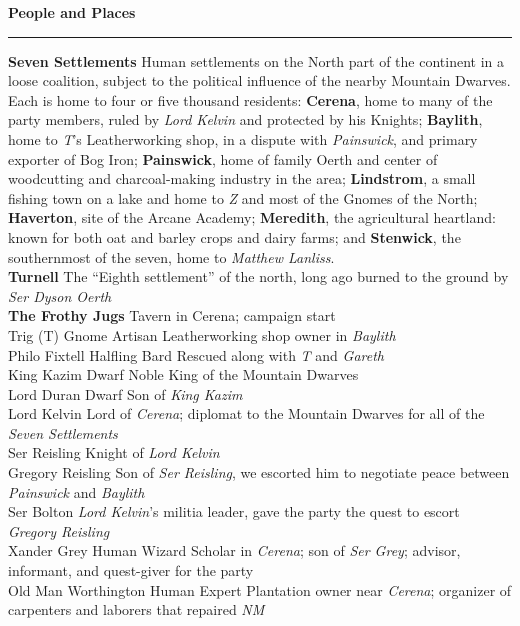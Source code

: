 \documentclass[letterpaper]{article}
\newcommand{\e}[1]{\emph{#1}}
\newcommand{\B}[1]{\textbf{#1}}
\newenvironment{notesection}[1]
{ {\huge \B{#1}}\hrule\vspace{0.5em}\begingroup\fontsize{9pt}{12pt}\selectfont}
{\endgroup}
\newcommand{\person}[3]{#1\B{
    \ifstrequal{#2}{M}{{\color{ProcessBlue}\male}}{%
    \ifstrequal{#2}{F}{\color{VioletRed}\female}{}}} #3}
\begin{document}
\twocolumn
\begin{notesection}{People and Places}
\B{Seven Settlements} Human settlements on the North part of the continent in a loose coalition, subject to the political influence of the nearby Mountain Dwarves. Each is home to four or five thousand residents: \B{Cerena}, home to many of the party members, ruled by \e{Lord Kelvin} and protected by his Knights; \B{Baylith}, home to \e{T}'s Leatherworking shop, in a dispute with \e{Painswick}, and primary exporter of Bog Iron; \B{Painswick}, home of family Oerth and center of woodcutting and charcoal-making industry in the area; \B{Lindstrom}, a small fishing town on a lake and home to \e{Z} and most of the Gnomes of the North; \B{Haverton}, site of the Arcane Academy; \B{Meredith}, the agricultural heartland: known for both oat and barley crops and dairy farms; and \B{Stenwick}, the southernmost of the seven, home to \e{Matthew Lanliss}.\\
\B{Turnell} The ``Eighth settlement'' of the north, long ago burned to the ground by \e{Ser Dyson Oerth} \\
\B{The Frothy Jugs} Tavern in Cerena; campaign start\\
\person{Trig (T)}{F}{Gnome Artisan} Leatherworking shop owner in \e{Baylith} \\
\person{Philo Fixtell}{M}{Halfling Bard} Rescued along with \e{T} and \e{Gareth}\\
\person{King Kazim}{M}{Dwarf Noble} King of the Mountain Dwarves\\
\person{Lord Duran}{M}{Dwarf} Son of \e{King Kazim}\\
\person{Lord Kelvin}{M}{} Lord of \e{Cerena}; diplomat to the Mountain Dwarves for all of the \e{Seven Settlements}\\
\person{Ser Reisling}{M}{} Knight of \e{Lord Kelvin}\\
\person{Gregory Reisling}{M}{} Son of \e{Ser Reisling}, we escorted him to negotiate peace between \e{Painswick} and \e{Baylith}\\
\person{Ser Bolton}{M}{} \e{Lord Kelvin}'s militia leader, gave the party the quest to escort \e{Gregory Reisling} \\
\person{Xander Grey}{M}{Human Wizard} Scholar in \e{Cerena}; son of \e{Ser Grey}; advisor, informant, and quest-giver for the party\\
\person{Old Man Worthington}{M}{Human Expert} Plantation owner near \e{Cerena}; organizer of carpenters and laborers that repaired \e{NM}\\

\end{notesection}
\end{document}
